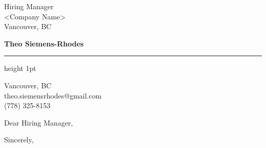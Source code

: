 \documentclass{letter}
\begin{document}
\signature{Theo Siemens-Rhodes}
\longindentation=0pt
\let\raggedleft\raggedright

\begin{letter}{Hiring Manager \\
<Company Name>\\
Vancouver, BC}

\begin{flushleft}
{\large\bf Theo Siemens-Rhodes}
\end{flushleft}
\medskip\hrule height 1pt
\begin{flushright}
\hfill Vancouver, BC \\
\hfill theo.siemensrhodes@gmail.com \\
\hfill (778) 325-8153
\end{flushright} 
\vfill

\opening{Dear Hiring Manager,}


\closing{Sincerely,}

\end{letter}
\end{document}
